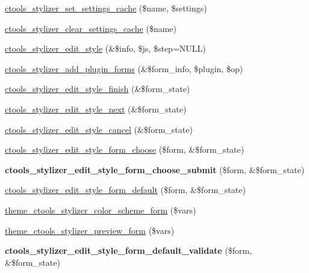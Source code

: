 \begin{DoxyCompactItemize}
\item 
\hyperlink{includes_2stylizer_8inc_a1e9a6f376ae340e6a11781cfa685cf93}{ctools\_\-stylizer\_\-set\_\-settings\_\-cache} (\$name, \$settings)
\item 
\hyperlink{includes_2stylizer_8inc_ab91af32e3082d221aa8144c028118dfb}{ctools\_\-stylizer\_\-clear\_\-settings\_\-cache} (\$name)
\item 
\hyperlink{includes_2stylizer_8inc_a2994ded9c52e1e455c4a30ea32e00dfe}{ctools\_\-stylizer\_\-edit\_\-style} (\&\$info, \$js, \$step=NULL)
\item 
\hyperlink{includes_2stylizer_8inc_a88a387dceced85748501cc732527a6d7}{ctools\_\-stylizer\_\-add\_\-plugin\_\-forms} (\&\$form\_\-info, \$plugin, \$op)
\item 
\hyperlink{includes_2stylizer_8inc_a897c5d38ec52466fa484c5add71619a5}{ctools\_\-stylizer\_\-edit\_\-style\_\-finish} (\&\$form\_\-state)
\item 
\hyperlink{includes_2stylizer_8inc_aa965f7128e036ac9223bf2e8b4e4b402}{ctools\_\-stylizer\_\-edit\_\-style\_\-next} (\&\$form\_\-state)
\item 
\hyperlink{includes_2stylizer_8inc_af02ad7c6b2aab483f496fffa2c8cf216}{ctools\_\-stylizer\_\-edit\_\-style\_\-cancel} (\&\$form\_\-state)
\item 
\hyperlink{includes_2stylizer_8inc_aeffb777bc34c369ab1981f2b324ca860}{ctools\_\-stylizer\_\-edit\_\-style\_\-form\_\-choose} (\$form, \&\$form\_\-state)
\item 
\hypertarget{includes_2stylizer_8inc_a09e7422a98d6871c521bd3f4e05a84bd}{
{\bfseries ctools\_\-stylizer\_\-edit\_\-style\_\-form\_\-choose\_\-submit} (\$form, \&\$form\_\-state)}
\label{includes_2stylizer_8inc_a09e7422a98d6871c521bd3f4e05a84bd}

\item 
\hyperlink{includes_2stylizer_8inc_a0f7711669e8b041a205d762e6aa27f28}{ctools\_\-stylizer\_\-edit\_\-style\_\-form\_\-default} (\$form, \&\$form\_\-state)
\item 
\hyperlink{includes_2stylizer_8inc_a2ed3629828e5cfe1c833bbf3cc9ddd05}{theme\_\-ctools\_\-stylizer\_\-color\_\-scheme\_\-form} (\$vars)
\item 
\hyperlink{includes_2stylizer_8inc_ac11c0cb46ff3730fc4beb56a6e1f15c9}{theme\_\-ctools\_\-stylizer\_\-preview\_\-form} (\$vars)
\item 
\hypertarget{includes_2stylizer_8inc_a4b2db71807a667ed51d29ddd8f0a87d2}{
{\bfseries ctools\_\-stylizer\_\-edit\_\-style\_\-form\_\-default\_\-validate} (\$form, \&\$form\_\-state)}
\label{includes_2stylizer_8inc_a4b2db71807a667ed51d29ddd8f0a87d2}


\end{DoxyCompactItemize}
